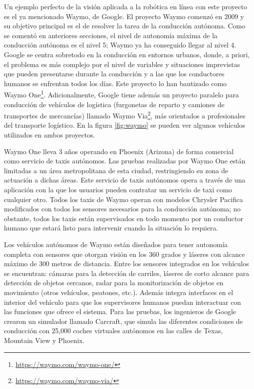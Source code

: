 Un ejemplo perfecto de la visión aplicada a la robótica en línea con este proyecto es el ya mencionado Waymo, de Google. El proyecto Waymo comenzó en 2009 y su objetivo principal es el de resolver la tarea de la conducción autónoma. Como se comentó en anteriores secciones, el nivel de autonomía máxima de la conducción autónoma es el nivel 5; Waymo ya ha conseguido llegar al nivel 4. Google se centra sobretodo en la conducción en entornos urbanos, donde, a priori, el problema es más complejo por el nivel de variables y situaciones imprevistas que pueden presentarse durante la conducción y a las que los conductores humanos se enfrentan todos los días. Este proyecto lo han bautizado como Waymo One\footnote{\url{https://waymo.com/waymo-one/}}. Adicionalmente, Google tiene además un proyecto paralelo para conducción de vehículos de logística (furgonetas de reparto y camiones de transportes de mercancías) llamado Waymo Via\footnote{\url{https://waymo.com/waymo-via/}}, más orientados a profesionales del transporte logístico. En la figura \ref{fig:waymo} se pueden ver algunos vehículos utilizados en ambos proyectos.

Waymo One lleva 3 años operando en Phoenix (Arizona) de forma comercial como servicio de taxis autónomos. Las pruebas realizadas por Waymo One están limitadas a un área metropolitana de esta ciudad, restringiendo su zona de actuación a dichas áreas. Este servicio de taxis autónomos opera a través de una aplicación con la que los usuarios pueden contratar un servicio de taxi como cualquier otro. Todos los taxis de Waymo operan con modelos Chrysler Pacifica modificados con todos los sensores necesarios para la conducción autónoma; no obstante, todos los taxis están supervisados en todo momento por un conductor humano que estará listo para intervenir cuando la situación lo requiera. 

Los vehículos autónomos de Waymo están diseñados para tener autonomía completa con sensores que otorgan visión en los 360 grados y láseres con alcance máximo de 300 metros de distancia. Entre los sensores integrados en los vehículos se encuentran: cámaras para la detección de carriles, láseres de corto alcance para detección de objetos cercanos, radar para la monitorización de objetos en movimiento (otros vehículos, peatones, etc.). Además integra interfaces en el interior del vehículo para que los supervisores humanos puedan interactuar con las funciones que ofrece el sistema. Para las pruebas, los ingenieros de Google crearon un simulador llamado Carcraft, que simula las diferentes condiciones de conducción con 25,000 coches virtuales autónomos en las calles de Texas, Mountain View y Phoenix.

